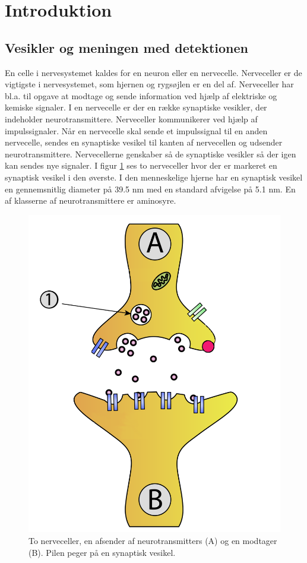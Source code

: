 \pagestyle{headings}
\section{Introduktion}
\subsection{Vesikler og meningen med detektionen}
En celle i nervesystemet kaldes for en neuron eller en nervecelle. Nerveceller er de vigtigste i nervesystemet, som hjernen og rygsøjlen er en del af.
Nerveceller har bl.a. til opgave at modtage og sende information ved hjælp af elektriske og kemiske signaler. I en nervecelle er der en række synaptiske vesikler, der indeholder neurotransmittere. Nerveceller kommunikerer ved hjælp af impulssignaler. Når en nervecelle skal sende et impulssignal til en anden nervecelle, sendes en synaptiske vesikel til kanten af nervecellen og udsender neurotransmittere. Nervecellerne genskaber så de synaptiske vesikler så der igen kan sendes nye signaler. I figur \ref{fig:intro_syntrans} ses to nerveceller hvor der er markeret en synaptisk vesikel i den øverste. I den menneskelige hjerne har en synaptisk vesikel en gennemsnitlig diameter på 39.5 nm med en standard afvigelse på 5.1 nm. En af klasserne af neurotransmittere er aminosyre.
\begin{figure}[H]
	\centering
	\includegraphics[scale=0.2]{files/intro/img/synTransmitter.png}
	\caption{To nerveceller, en afsender af neurotransmitters (A) og en modtager (B). Pilen peger på en synaptisk vesikel.\label{fig:intro_syntrans}}
\end{figure} 

